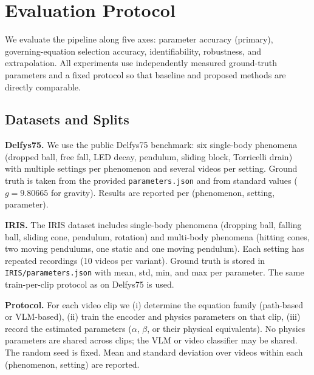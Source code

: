 
\section{Evaluation Protocol}
\label{sec:eval_protocol}

We evaluate the pipeline along five axes: parameter accuracy (primary), governing-equation selection accuracy, identifiability, robustness, and extrapolation. All experiments use independently measured ground-truth parameters and a fixed protocol so that baseline and proposed methods are directly comparable.

\subsection{Datasets and Splits}
\label{sec:eval_datasets}

\textbf{Delfys75.} We use the public Delfys75 benchmark: six single-body phenomena (dropped ball, free fall, LED decay, pendulum, sliding block, Torricelli drain) with multiple settings per phenomenon and several videos per setting. Ground truth is taken from the provided \texttt{parameters.json} and from standard values ($g = 9.80665$ for gravity). Results are reported per (phenomenon, setting, parameter).

\textbf{IRIS.} The IRIS dataset includes single-body phenomena (dropping ball, falling ball, sliding cone, pendulum, rotation) and multi-body phenomena (hitting cones, two moving pendulums, one static and one moving pendulum). Each setting has repeated recordings (10 videos per variant). Ground truth is stored in \texttt{IRIS/parameters.json} with mean, std, min, and max per parameter. The same train-per-clip protocol as on Delfys75 is used.

\textbf{Protocol.} For each video clip we (i) determine the equation family (path-based or VLM-based), (ii) train the encoder and physics parameters on that clip, (iii) record the estimated parameters ($\alpha$, $\beta$, or their physical equivalents). No physics parameters are shared across clips; the VLM or video classifier may be shared. The random seed is fixed. Mean and standard deviation over videos within each (phenomenon, setting) are reported.

